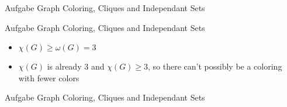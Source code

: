 \begin{frame}[allowframebreaks]{Aufgabe \thesection}{Graph Coloring, Cliques and Independant Sets}
  \begin{solutionnoinc}
  \end{solutionnoinc}
  \begin{solutionnoinc}
  \end{solutionnoinc}
  \begin{solution}
  \end{solution}
\end{frame}

\begin{frame}[allowframebreaks]{Aufgabe \thesection}{Graph Coloring, Cliques and Independant Sets}
  \begin{solutionnoinc}
  \end{solutionnoinc}
  \begin{solution}
    \begin{itemize}
      \item $\chi(G)\ge \omega(G) = 3$
      \item $\chi(G)$ is already $3$ and $\chi(G)\ge 3$, so there can't possibly be a coloring with fewer colors
    \end{itemize}
  \end{solution}
\end{frame}

\begin{frame}[allowframebreaks]{Aufgabe \thesection}{Graph Coloring, Cliques and Independant Sets}
  \begin{solution}
  \end{solution}
\end{frame}

